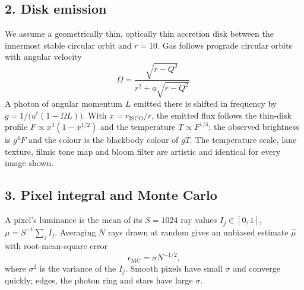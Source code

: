 \documentclass[11pt,twocolumn]{article}
\begin{document}
\subsection*{2. Disk emission}
We assume a geometrically thin, optically thin accretion disk between the innermost stable circular
orbit and $r = 10$. Gas follows prograde circular orbits with angular velocity
\begin{equation}
  \Omega = \frac{\sqrt{r - Q^2}}{r^2 + a\sqrt{r - Q^2}}.
\end{equation}
A photon of angular momentum $L$ emitted there is shifted in frequency by
$g = 1/\bigl(u^t(1 - \Omega L)\bigr)$. With $x = r_{\mathrm{ISCO}}/r$, the emitted flux follows the
thin-disk profile $F \propto x^3(1 - x^{1/2})$ and the temperature $T \propto F^{1/4}$; the observed
brightness is $g^4 F$ and the colour is the blackbody colour of $gT$. The temperature scale, lane
texture, filmic tone map and bloom filter are artistic and identical for every image shown.

\subsection*{3. Pixel integral and Monte Carlo}
A pixel's luminance is the mean of its $S = 1024$ ray values $I_j \in [0, 1]$,
$\mu = S^{-1}\sum_j I_j$. Averaging $N$ rays drawn at random gives an unbiased estimate $\hat\mu$
with root-mean-square error
\begin{equation}
  \epsilon_{\mathrm{MC}} = \sigma N^{-1/2},
\end{equation}
where $\sigma^2$ is the variance of the $I_j$. Smooth pixels have small $\sigma$ and converge
quickly; edges, the photon ring and stars have large $\sigma$.
\end{document}
